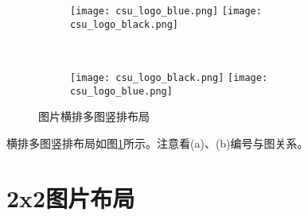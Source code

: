 \begin{figure}[!htb]
    \centering
    \begin{subfigure}[t]{0.3\linewidth}
        \captionsetup{justification=centering} 
        \begin{minipage}[b]{1\linewidth}
        \texttt{[image: csu\_logo\_blue.png]}
        \texttt{[image: csu\_logo\_black.png]}
        \caption{}
        \end{minipage}
    \end{subfigure}\\
    \begin{subfigure}[t]{0.3\linewidth}
        \captionsetup{justification=centering} 
        \begin{minipage}[b]{1\linewidth}
        \texttt{[image: csu\_logo\_black.png]}
        \texttt{[image: csu\_logo\_blue.png]}
        \caption{}
        \end{minipage}
    \end{subfigure}
    \caption{图片横排多图竖排布局}
    \label{f.csu_row_col}
\end{figure}

横排多图竖排布局如图\ref{f.csu_row_col}所示。注意看(a)、(b)编号与图关系。

\section{2x2图片布局}

